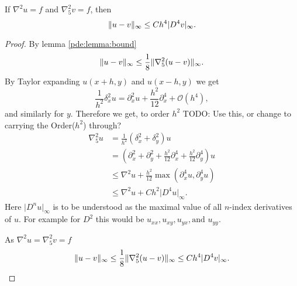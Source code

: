 \begin{theorem}
If $\nabla^2 u = f$ and $\nabla_5^2 v = f$, then
$$
\lVert u - v \rVert_\infty \leq Ch^4 \lvert D^4 v\rvert_\infty.
$$
\end{theorem}
\begin{proof}
By lemma \ref{pde:lemma:bound}
$$
\lVert u - v \rVert_\infty \leq \frac18 \lVert \nabla_5^2 (u  - v) \rVert_\infty.
$$
By Taylor expanding $u(x + h, y)$ and $u(x - h, y)$ we get
$$
\frac{1}{h^2} \delta_x^2 u = \partial_x^2 u + \frac{h^2}{12} \partial_x^4 + \mathcal{O}(h^4),
$$
and similarly for $y$.
Therefore we get, to order $h^2$ TODO: Use this, or change to carrying the Order($h^2$) through?
\begin{align*}
  \nabla_5^2 u
  &=\frac{1}{h^2} (\delta_x^2 + \delta_y^2) u\\
  &= (\partial_x^2 + \partial_y^2 + \frac{h^2}{12} \partial_x^4 + \frac{h^2}{12} \partial_y^4) u\\
  &\leq \nabla^2 u + \frac{h^2}{12} \max(\partial_x^4 u, \partial_y^4 u)\\
  &\leq \nabla^2 u + C h^2 \lvert D^4 u \rvert_\infty.
\end{align*}
Here $\lvert D^n u\rvert_\infty$ is to be understood as the maximal value of all $n$-index derivatives of $u$.
For example for $D^2$ this would be $u_{xx}, u_{xy}, u_{yx}, \text{and } u_{yy}$.

As $\nabla^2 u = \nabla_5^2 v = f$
\begin{equation}
  \lVert u - v \rVert_\infty
  \leq \frac18 \lVert \nabla_5^2 (u  - v) \rVert_\infty
  \leq Ch^4 \lvert D^4 v\rvert_\infty.
\end{equation}
\end{proof}


